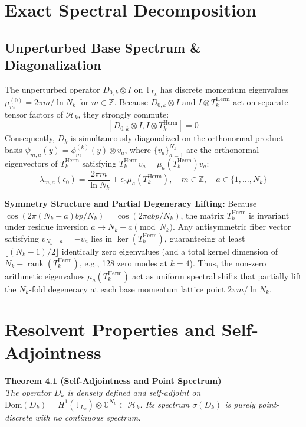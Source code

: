 \documentclass[11pt, a4paper]{article}
\begin{document}
\section{Exact Spectral Decomposition}

\subsection{Unperturbed Base Spectrum \& Diagonalization}
The unperturbed operator $D_{0,k} \otimes I$ on $\mathbb{T}_{L_k}$ has discrete momentum eigenvalues $\mu_m^{(0)} = 2\pi m / \ln N_k$ for $m \in \mathbb{Z}$. Because $D_{0,k} \otimes I$ and $I \otimes T_k^{\mathrm{Herm}}$ act on separate tensor factors of $\mathcal{H}_k$, they strongly commute:
\[ [D_{0,k} \otimes I, I \otimes T_k^{\mathrm{Herm}}] = 0 \]
Consequently, $D_k$ is simultaneously diagonalized on the orthonormal product basis $\psi_{m,a}(y) = \phi_m^{(k)}(y) \otimes v_a$, where $\{v_a\}_{a=1}^{N_k}$ are the orthonormal eigenvectors of $T_k^{\mathrm{Herm}}$ satisfying $T_k^{\mathrm{Herm}} v_a = \mu_a(T_k^{\mathrm{Herm}}) v_a$:
\[ \lambda_{m,a}(\epsilon_0) = \frac{2\pi m}{\ln N_k} + \epsilon_0 \mu_a(T_k^{\mathrm{Herm}}), \quad m \in \mathbb{Z}, \quad a \in \{1, \dots, N_k\} \]

\textbf{Symmetry Structure and Partial Degeneracy Lifting:} Because $\cos(2\pi(N_k - a)bp/N_k) = \cos(2\pi abp/N_k)$, the matrix $T_k^{\mathrm{Herm}}$ is invariant under residue inversion $a \mapsto N_k - a \pmod{N_k}$. Any antisymmetric fiber vector satisfying $v_{N_k-a} = -v_a$ lies in $\ker(T_k^{\mathrm{Herm}})$, guaranteeing at least $\lfloor(N_k - 1)/2\rfloor$ identically zero eigenvalues (and a total kernel dimension of $N_k - \operatorname{rank}(T_k^{\mathrm{Herm}})$, e.g., 128 zero modes at $k=4$). Thus, the non-zero arithmetic eigenvalues $\mu_a(T_k^{\mathrm{Herm}})$ act as uniform spectral shifts that partially lift the $N_k$-fold degeneracy at each base momentum lattice point $2\pi m / \ln N_k$.

\section{Resolvent Properties and Self-Adjointness}

\noindent\textbf{Theorem 4.1 (Self-Adjointness and Point Spectrum)}\\
\textit{The operator $D_k$ is densely defined and self-adjoint on $\mathrm{Dom}(D_k) = H^1(\mathbb{T}_{L_k}) \otimes \mathbb{C}^{N_k} \subset \mathcal{H}_k$. Its spectrum $\sigma(D_k)$ is purely point-discrete with no continuous spectrum.}
\end{document}

